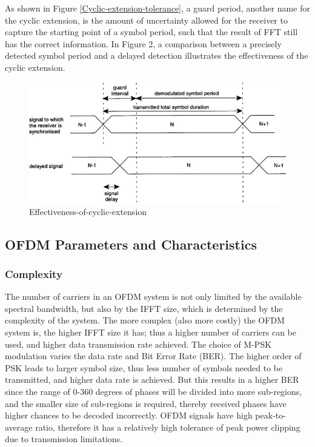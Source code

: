 As shown in Figure \ref{Cyclic-extension-tolerance}, a guard period, another name for the cyclic extension, is the amount of uncertainty allowed for the receiver to capture the starting point of a symbol period, such that the result of FFT still has the correct information. In Figure 2, a comparison between a precisely detected symbol period and a delayed detection illustrates the effectiveness of the cyclic extension.

\begin{figure}[ht]
    \centering
    \includegraphics[width=\textwidth]{Figures/Effectiveness-of-cyclic-extension}
    \caption{Effectiveness-of-cyclic-extension}
    \label{Effectiveness-of-cyclic-extension}
\end{figure}

\subsection{OFDM Parameters and Characteristics}

\subsubsection{Complexity}

The number of carriers in an OFDM system is not only limited by the available spectral bandwidth, but also by the IFFT size, which is determined by the complexity of the system. The more complex (also more costly) the OFDM system is, the higher IFFT size it has; thus a higher number of carriers can be used, and higher data transmission rate achieved. The choice of M-PSK modulation varies the data rate and Bit Error Rate (BER). The higher order of PSK leads to larger symbol size, thus less number of symbols needed to be transmitted, and higher data rate is achieved. But this results in a higher BER since the range of 0-360 degrees of phases will be divided into more sub-regions, and the smaller size of sub-regions is required, thereby received phases have higher chances to be decoded incorrectly. OFDM signals have high peak-to-average ratio, therefore it has a relatively high tolerance of peak power clipping due to transmission limitations.

